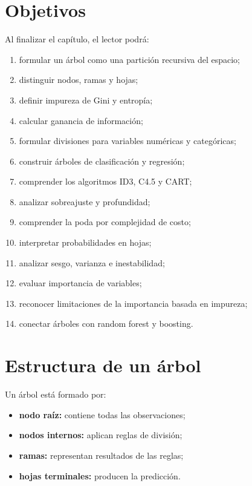 \documentclass[
  spanish,
  10.5pt,
  letterpaper,
  DIV=11,
  numbers=noendperiod,
  oneside,
  open=any]{scrreprt}
\providecommand{\tightlist}{%
  \setlength{\itemsep}{0pt}\setlength{\parskip}{0pt}}
\theoremstyle{definition}
\theoremstyle{definition}
\theoremstyle{plain}
\theoremstyle{remark}
\begin{document}
\section*{Objetivos}\label{objetivos-12}


Al finalizar el capítulo, el lector podrá:

\begin{enumerate}
\def\labelenumi{\arabic{enumi}.}
\tightlist
\item
  formular un árbol como una partición recursiva del espacio;
\item
  distinguir nodos, ramas y hojas;
\item
  definir impureza de Gini y
  entropía;
\item
  calcular ganancia de información;
\item
  formular divisiones para variables numéricas y categóricas;
\item
  construir árboles de clasificación y regresión;
\item
  comprender los algoritmos ID3, C4.5 y CART;
\item
  analizar sobreajuste y profundidad;
\item
  comprender la poda por complejidad de costo;
\item
  interpretar probabilidades en hojas;
\item
  analizar sesgo, varianza e inestabilidad;
\item
  evaluar importancia de variables;
\item
  reconocer limitaciones de la importancia basada en impureza;
\item
  conectar árboles con random forest y boosting.
\end{enumerate}

\section*{Estructura de un árbol}\label{estructura-de-un-uxe1rbol}


Un árbol está formado por:

\begin{itemize}
\tightlist
\item
  \textbf{nodo raíz:} contiene todas las observaciones;
\item
  \textbf{nodos internos:} aplican reglas de división;
\item
  \textbf{ramas:} representan resultados de las reglas;
\item
  \textbf{hojas terminales:} producen la predicción.
\end{itemize}
\end{document}
